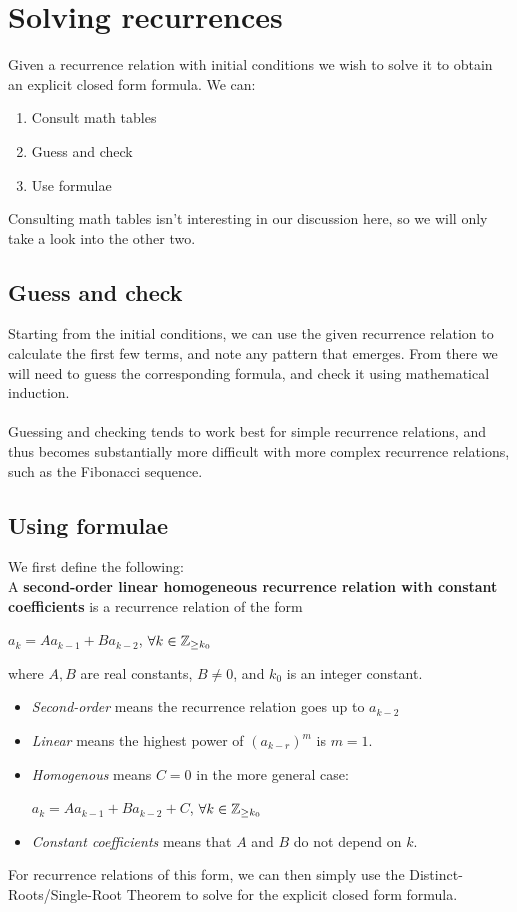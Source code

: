 \documentclass[a4paper]{article}
\begin{document}
\section{Solving recurrences}
Given a recurrence relation with initial conditions we wish to solve it to obtain an explicit closed form formula. We can:
\begin{enumerate}
	\item Consult math tables
	\item Guess and check
	\item Use formulae
\end{enumerate}
Consulting math tables isn't interesting in our discussion here, so we will only take a look into the other two.
\subsection{Guess and check}
Starting from the initial conditions, we can use the given recurrence relation to calculate the first few terms, and note any pattern that emerges. From there we will need to guess the corresponding formula, and check it using mathematical induction.\\\\
Guessing and checking tends to work best for simple recurrence relations, and thus becomes substantially more difficult with more complex recurrence relations, such as the Fibonacci sequence.
\subsection{Using formulae}
We first define the following:\\
A \textbf{second-order linear homogeneous recurrence relation with constant coefficients} is a recurrence relation of the form
\begin{center}
	$a_k = Aa_{k-1} + Ba_{k-2}$, $\forall k\in \mathbb{Z}_{\ge k_0}$
\end{center}
where $A,B$ are real constants, $B\neq 0$, and $k_0$ is an integer constant.
\begin{itemize}
	\item \textit{Second-order} means the recurrence relation goes up to $a_{k-2}$
	\item \textit{Linear} means the highest power of $(a_{k-r})^m$ is $m=1$.
	\item \textit{Homogenous} means $C=0$ in the more general case:
	\begin{center}
		$a_k = Aa_{k-1} + Ba_{k-2} + C$, $\forall k\in \mathbb{Z}_{\ge k_0}$
	\end{center}
	\item \textit{Constant coefficients} means that $A$ and $B$ do not depend on $k$.
\end{itemize}
For recurrence relations of this form, we can then simply use the Distinct-Roots/Single-Root Theorem to solve for the explicit closed form formula.
\end{document}
